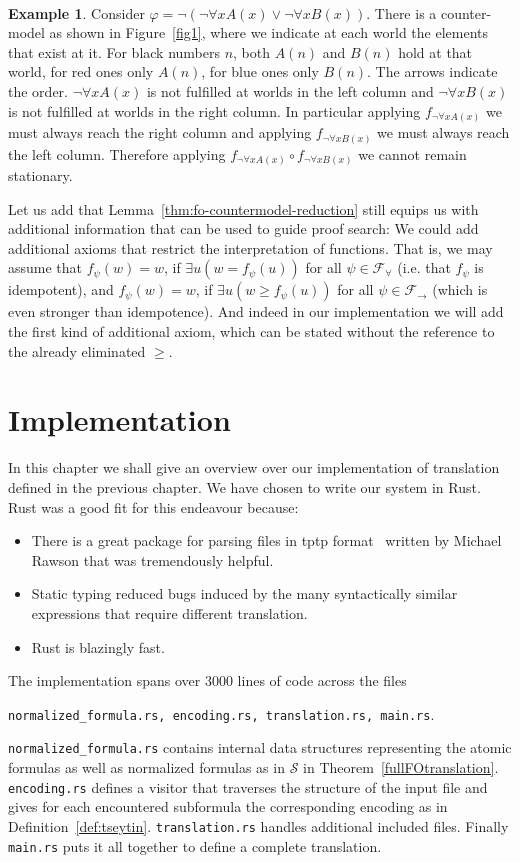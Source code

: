 \documentclass[a4paper,11pt]{report}
\theoremstyle{definition}
\theoremstyle{definition}
\theoremstyle{definition}
\theoremstyle{definition}
\theoremstyle{definition}
\theoremstyle{definition}
\newtheorem{example}[theorem]{Example}
\theoremstyle{definition}
\begin{document}
	\
	\begin{example}
		Consider $\varphi = \neg(\neg \forall xA(x)\vee\neg \forall xB(x))$. There is a counter-model as shown in Figure~\ref{fig1},
		where we indicate at each world the elements that exist at it. For black numbers $n$, both $A(n)$ and $B(n)$ hold at that world, for red ones only $A(n)$, for blue ones only $B(n)$. The arrows indicate the order. $\neg\forall xA(x)$ is not fulfilled at worlds in the left column and $\neg\forall xB(x)$ is not fulfilled at worlds in the right column. In particular applying $f_{\neg \forall xA(x)}$ we must always reach the right column and applying $f_{\neg \forall xB(x)}$ we must always reach the left column. Therefore applying $f_{\neg \forall xA(x)}\circ f_{\neg \forall xB(x)}$ we cannot remain stationary.
	\end{example}
	
	Let us add that Lemma~\ref{thm:fo-countermodel-reduction} still equips us with additional information that can be used to guide proof search: We could add additional axioms that restrict the interpretation of functions. That is, we may assume that $f_\psi(w) = w$, if $\exists u(w = f_\psi(u))$ for all $\psi\in\mathcal F_\forall$ (i.e. that $f_\psi$ is idempotent), and $f_\psi(w) = w$, if $\exists u(w \geq f_\psi(u))$ for all $\psi\in\mathcal F_\to$ (which is even stronger than idempotence). And indeed in our implementation we will add the first kind of additional axiom, which can be stated without the reference to the already eliminated $\geq$.
	
	\chapter{Implementation}
	
	In this chapter we shall give an overview over our implementation of translation defined in the previous chapter. We have chosen to write our system in Rust. Rust was a good fit for this endeavour because:
	\begin{itemize}
		\item There is a great package for parsing files in tptp format~\cite{rust-tptp} written by Michael Rawson that was tremendously helpful.
		\item Static typing reduced bugs induced by the many syntactically similar expressions that require different translation.
		\item Rust is blazingly fast.
	\end{itemize}
	The implementation spans over 3000 lines of code across the files 
	\begin{center}\lstinline|normalized_formula.rs, encoding.rs, translation.rs, main.rs|.\end{center}
	\lstinline|normalized_formula.rs| contains internal data structures representing the atomic formulas as well as normalized formulas as in $\mathcal S$ in Theorem~\ref{fullFOtranslation}. \lstinline|encoding.rs| defines a visitor that traverses the structure of the input file and gives for each encountered subformula the corresponding encoding as in Definition~\ref{def:tseytin}. \lstinline|translation.rs| handles additional included files. Finally \lstinline|main.rs| puts it all together to define a complete translation.
	
\end{document}
